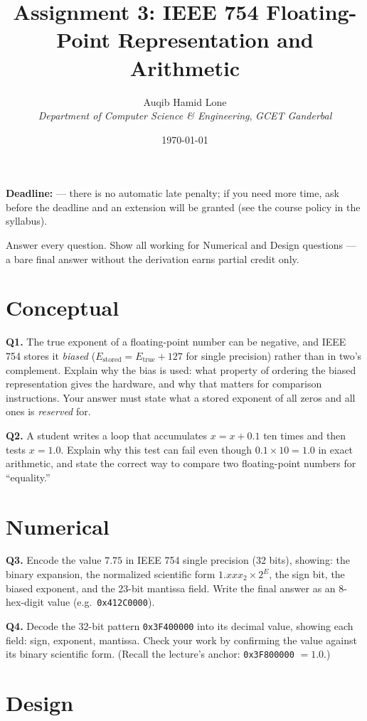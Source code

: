 \documentclass[11pt]{article}
\title{Assignment 3: IEEE 754 Floating-Point Representation and Arithmetic}
\author{Auqib Hamid Lone\\[0.3em]
  \emph{Department of Computer Science \& Engineering}, \emph{GCET Ganderbal}}
\date{\today}
\begin{document}
\maketitle

\noindent\textbf{Deadline:}  --- there is no automatic late penalty; if you need more time, ask before the deadline and an extension will be granted (see the course policy in the syllabus).

\noindent Answer every question. Show all working for Numerical and Design questions --- a bare final answer without the derivation earns partial credit only.

\section{Conceptual}

\textbf{Q1.} The true exponent of a floating-point number can be negative, and IEEE 754 stores it \emph{biased} ($E_{\text{stored}} = E_{\text{true}} + 127$ for single precision) rather than in two's complement. Explain why the bias is used: what property of ordering the biased representation gives the hardware, and why that matters for comparison instructions. Your answer must state what a stored exponent of all zeros and all ones is \emph{reserved} for.

\textbf{Q2.} A student writes a loop that accumulates $x = x + 0.1$ ten times and then tests $x = 1.0$. Explain why this test can fail even though $0.1 \times 10 = 1.0$ in exact arithmetic, and state the correct way to compare two floating-point numbers for ``equality.''

\section{Numerical}

\textbf{Q3.} Encode the value $7.75$ in IEEE 754 single precision (32 bits), showing: the binary expansion, the normalized scientific form $1.xxx_2 \times 2^E$, the sign bit, the biased exponent, and the 23-bit mantissa field. Write the final answer as an 8-hex-digit value (e.g.\ \texttt{0x412C0000}).

\textbf{Q4.} Decode the 32-bit pattern \texttt{0x3F400000} into its decimal value, showing each field: sign, exponent, mantissa. Check your work by confirming the value against its binary scientific form. (Recall the lecture's anchor: \texttt{0x3F800000} $= 1.0$.)

\section{Design}
\end{document}
